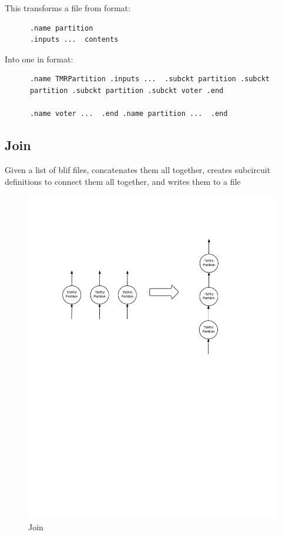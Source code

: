 \documentclass[12pt,final,oneside]{dwThesis} %
\begin{document}
   This transforms a file from format: 
   \begin{lstlisting}
      .name partition
      .inputs ...  contents 
   \end{lstlisting}
   Into one in format:

   \begin{lstlisting}
      .name TMRPartition .inputs ...  .subckt partition .subckt
      partition .subckt partition .subckt voter .end

      .name voter ...  .end .name partition ...  .end 
   \end{lstlisting}


   \newpage 
   \subsection{Join}
   \label{algJoin} Given a list of blif files,
   concatenates them all together, creates subcircuit definitions to connect
   them all together, and writes them to a file 
   \begin{figure}

      \begin{center}

         \includegraphics[width=\linewidth]{images/Join.pdf} \caption{Join}
         \label{imJoin} 
      \end{center}

   \end{figure}
\end{document}

